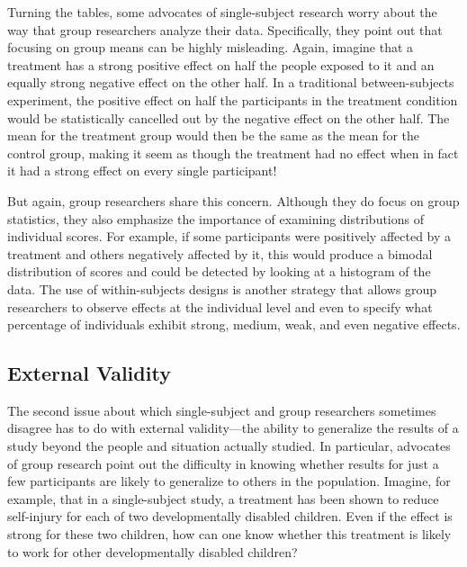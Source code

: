 \documentclass[
]{krantz}
\begin{document}
Turning the tables, some advocates of single-subject research worry about the way that group researchers analyze their data. Specifically, they point out that focusing on group means can be highly misleading. Again, imagine that a treatment has a strong positive effect on half the people exposed to it and an equally strong negative effect on the other half. In a traditional between-subjects experiment, the positive effect on half the participants in the treatment condition would be statistically cancelled out by the negative effect on the other half. The mean for the treatment group would then be the same as the mean for the control group, making it seem as though the treatment had no effect when in fact it had a strong effect on every single participant!

But again, group researchers share this concern. Although they do focus on group statistics, they also emphasize the importance of examining distributions of individual scores. For example, if some participants were positively affected by a treatment and others negatively affected by it, this would produce a bimodal distribution of scores and could be detected by looking at a histogram of the data. The use of within-subjects designs is another strategy that allows group researchers to observe effects at the individual level and even to specify what percentage of individuals exhibit strong, medium, weak, and even negative effects.

\hypertarget{external-validity-2}{%
\subsection*{External Validity}\label{external-validity-2}}


The second issue about which single-subject and group researchers sometimes disagree has to do with external validity---the ability to generalize the results of a study beyond the people and situation actually studied. In particular, advocates of group research point out the difficulty in knowing whether results for just a few participants are likely to generalize to others in the population. Imagine, for example, that in a single-subject study, a treatment has been shown to reduce self-injury for each of two developmentally disabled children. Even if the effect is strong for these two children, how can one know whether this treatment is likely to work for other developmentally disabled children?
\end{document}
